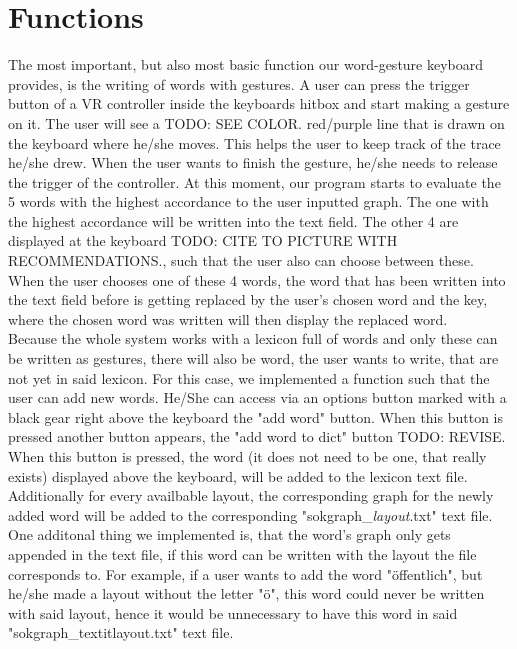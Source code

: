 \section{Functions}
The most important, but also most basic function our word-gesture keyboard provides, is the writing of words with gestures. A user can press the trigger button of a VR controller inside the keyboards hitbox and start making a gesture on it. The user will see a TODO: SEE COLOR. red/purple line that is drawn on the keyboard where he/she moves. This helps the user to keep track of the trace he/she drew. When the user wants to finish the gesture, he/she needs to release the trigger of the controller. At this moment, our program starts to evaluate the 5 words with the highest accordance to the user inputted graph. The one with the highest accordance will be written into the text field. The other 4 are displayed at the keyboard TODO: CITE TO PICTURE WITH RECOMMENDATIONS., such that the user also can choose between these. When the user chooses one of these 4 words, the word that has been written into the text field before is getting replaced by the user's chosen word and the key, where the chosen word was written will then display the replaced word.\\
Because the whole system works with a lexicon full of words and only these can be written as gestures, there will also be word, the user wants to write, that are not yet in said lexicon. For this case, we implemented a function such that the user can add new words. He/She can access via an options button marked with a black gear right above the keyboard the "add word" button. When this button is pressed another button appears, the "add word to dict" button TODO: REVISE. When this button is pressed, the word (it does not need to be one, that really exists) displayed above the keyboard, will be added to the lexicon text file. Additionally for every availbable layout, the corresponding graph for the newly added word will be added to the corresponding "sokgraph\_\textit{layout}.txt" text file. One additonal thing we implemented is, that the word's graph only gets appended in the text file, if this word can be written with the layout the file corresponds to. For example, if a user wants to add the word "öffentlich", but he/she made a layout without the letter "ö", this word could never be written with said layout, hence it would be unnecessary to have this word in said "sokgraph\_textit{layout}.txt" text file.\\

